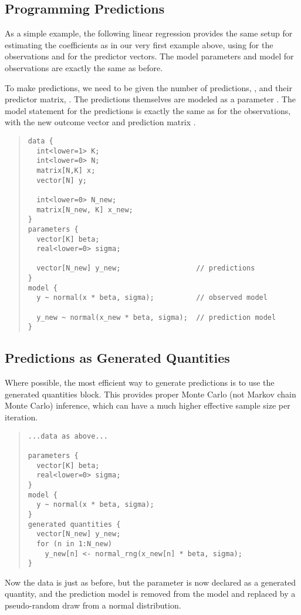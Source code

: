 \subsection{Programming Predictions}

As a simple example, the following linear regression provides the same
setup for estimating the coefficients  as in our very first
example above, using  for the  observations and
 for the  predictor vectors.  The model parameters and
model for observations are exactly the same as before.

To make predictions, we need to be given the number of predictions,
, and their predictor matrix, .  The
predictions themselves are modeled as a parameter .  The
model statement for the predictions is exactly the same as for the
observations, with the new outcome vector  and prediction
matrix .
%
\begin{quote}
\begin{Verbatim}
data {
  int<lower=1> K;
  int<lower=0> N;
  matrix[N,K] x;       
  vector[N] y;     

  int<lower=0> N_new;
  matrix[N_new, K] x_new; 
}
parameters {
  vector[K] beta;
  real<lower=0> sigma;

  vector[N_new] y_new;                  // predictions
}
model {
  y ~ normal(x * beta, sigma);          // observed model

  y_new ~ normal(x_new * beta, sigma);  // prediction model
}
\end{Verbatim}
\end{quote}


\subsection{Predictions as Generated Quantities}

Where possible, the most efficient way to generate predictions is to
use the generated quantities block.  This provides proper Monte Carlo
(not Markov chain Monte Carlo) inference, which can have a much higher
effective sample size per iteration.
%
\begin{quote}
\begin{Verbatim}
...data as above...

parameters {
  vector[K] beta;
  real<lower=0> sigma;
}
model {
  y ~ normal(x * beta, sigma);         
}
generated quantities {
  vector[N_new] y_new;  
  for (n in 1:N_new)
    y_new[n] <- normal_rng(x_new[n] * beta, sigma);
}
\end{Verbatim}
\end{quote}
%
Now the data is just as before, but the parameter  is now
declared as a generated quantity, and the prediction model is
removed from the model and replaced by a pseudo-random draw from a
normal distribution.

